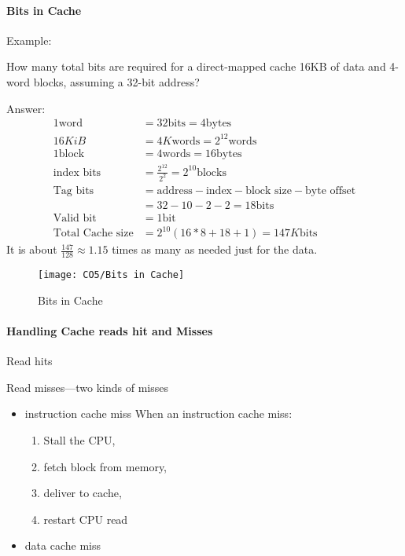 \paragraph{Bits in Cache}Example:

How many total bits are required for a direct-mapped cache 16KB of data and 4-word blocks, assuming a 32-bit address?

Answer: {\small
    \begin{align*}
        1 \text{word}&=32 \text{bits}=4 \text{bytes}\\
        16KiB&=4K \text{words}=2^{12} \text{words}\\
        1 \text{block}&=4 \text{words}=16\text{bytes}\\
        \text{index bits}&=\frac{2^{12}}{2^2}=2^{10}\text{blocks}\\
        \text{Tag bits}&=\text{address}-\text{index}-\text{block size}-\text{byte offset}\\
        &=32-10-2-2=18\text{bits}\\
        \text{Valid bit}&=1 \text{bit}\\
        \text{Total Cache size}&=2^{10}(16*8+18+1)=147K\text{bits}
    \end{align*}
}
It is about $\frac{147}{128}\approx 1.15$ times as many as needed just for the data. 

\begin{figure}[!htb]
    \centering
    \texttt{[image: CO5/Bits in Cache]}
    \caption{Bits in Cache}
\end{figure}



\paragraph{Handling Cache reads hit and Misses}\quad 

Read hits

Read misses—two kinds of misses
\begin{itemize}\small
    \item instruction cache miss
    \subitem When an instruction cache miss: 
    \begin{enumerate}
        \item Stall the CPU, 
        \item fetch block from memory, 
        \item deliver to cache, 
        \item restart CPU read
    \end{enumerate}
    \item data cache miss
\end{itemize}

